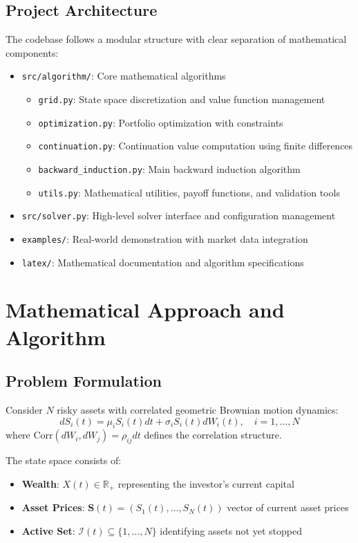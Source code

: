 \documentclass[11pt]{article}
\begin{document}
\subsection{Project Architecture}
The codebase follows a modular structure with clear separation of mathematical components:

\begin{itemize}
\item \texttt{src/algorithm/}: Core mathematical algorithms
\begin{itemize}
    \item \texttt{grid.py}: State space discretization and value function management
    \item \texttt{optimization.py}: Portfolio optimization with constraints
    \item \texttt{continuation.py}: Continuation value computation using finite differences
    \item \texttt{backward\_induction.py}: Main backward induction algorithm
    \item \texttt{utils.py}: Mathematical utilities, payoff functions, and validation tools
\end{itemize}
\item \texttt{src/solver.py}: High-level solver interface and configuration management
\item \texttt{examples/}: Real-world demonstration with market data integration
\item \texttt{latex/}: Mathematical documentation and algorithm specifications
\end{itemize}

\section{Mathematical Approach and Algorithm}

\subsection{Problem Formulation}
Consider $N$ risky assets with correlated geometric Brownian motion dynamics:
\begin{equation}
dS_i(t) = \mu_i S_i(t) dt + \sigma_i S_i(t) dW_i(t), \quad i = 1, \ldots, N
\end{equation}
where $\text{Corr}(dW_i, dW_j) = \rho_{ij}dt$ defines the correlation structure.

The state space consists of:
\begin{itemize}
\item \textbf{Wealth}: $X(t) \in \mathbb{R}_+$ representing the investor's current capital
\item \textbf{Asset Prices}: $\mathbf{S}(t) = (S_1(t), \ldots, S_N(t))$ vector of current asset prices
\item \textbf{Active Set}: $\mathcal{I}(t) \subseteq \{1, \ldots, N\}$ identifying assets not yet stopped
\end{itemize}
\end{document}
